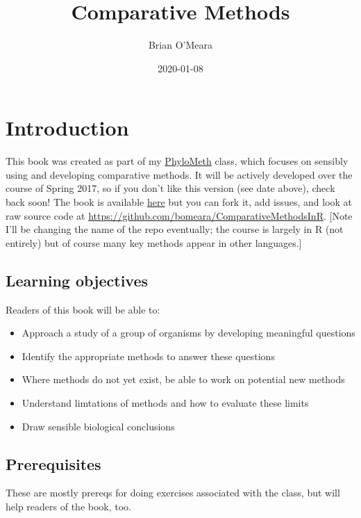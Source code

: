 \documentclass[
]{article}
\title{Comparative Methods}
\author{Brian O'Meara}
\date{2020-01-08}
\providecommand{\tightlist}{%
  \setlength{\itemsep}{0pt}\setlength{\parskip}{0pt}}
\begin{document}
\maketitle

{
\setcounter{tocdepth}{2}
\tableofcontents
}
\hypertarget{introduction}{%
\section{Introduction}\label{introduction}}

This book was created as part of my \href{http://phylometh.info}{PhyloMeth} class, which focuses on sensibly using and developing comparative methods. It will be actively developed over the course of Spring 2017, so if you don't like this version (see date above), check back soon! The book is available \href{https://bookdown.org/bomeara/comparative-methods/}{here} but you can fork it, add issues, and look at raw source code at \url{https://github.com/bomeara/ComparativeMethodsInR}. {[}Note I'll be changing the name of the repo eventually; the course is largely in R (not entirely) but of course many key methods appear in other languages.{]}

\hypertarget{learning-objectives}{%
\subsection{Learning objectives}\label{learning-objectives}}

Readers of this book will be able to:

\begin{itemize}
\tightlist
\item
  Approach a study of a group of organisms by developing meaningful questions
\item
  Identify the appropriate methods to answer these questions
\item
  Where methods do not yet exist, be able to work on potential new methods
\item
  Understand limtations of methods and how to evaluate these limits
\item
  Draw sensible biological conclusions
\end{itemize}

\hypertarget{prerequisites}{%
\subsection{Prerequisites}\label{prerequisites}}

These are mostly prereqs for doing exercises associated with the class, but will help readers of the book, too.
\end{document}
